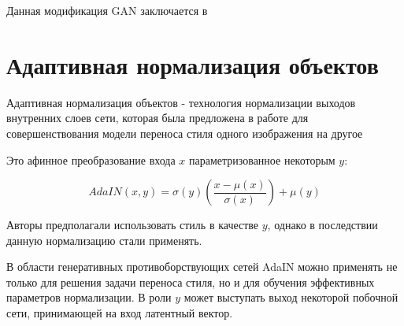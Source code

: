 Данная модификация GAN заключается в 


\section{Адаптивная нормализация объектов}

Адаптивная нормализация объектов - технология нормализации выходов внутренних слоев сети, которая была предложена в работе \cite{huang2017arbitrary} для совершенствования модели переноса стиля одного изображения на другое

Это афинное преобразование входа $x$ параметризованное некоторым $y$:

\begin{equation}
AdaIN(x, y) = \sigma(y)(\dfrac{x - \mu(x)}{\sigma(x)}) + \mu(y) \label{eq:adain}
\end{equation}

Авторы предполагали использовать стиль в качестве $y$, однако в последствии данную нормализацию стали применять.

В области генеративных противоборствующих сетей AdaIN можно применять не только для решения задачи переноса стиля, но и для обучения эффективных параметров нормализации. В роли $y$ может выступать выход некоторой побочной сети, принимающей на вход латентный вектор.